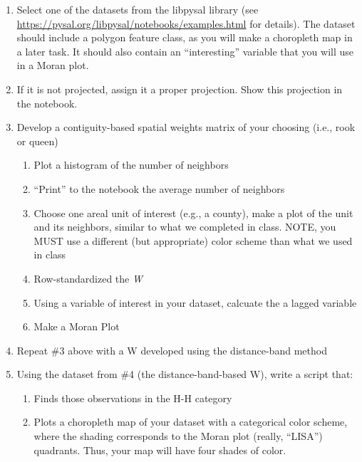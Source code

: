 \documentclass[]{article}
\providecommand{\tightlist}{%
  \setlength{\itemsep}{0pt}\setlength{\parskip}{0pt}}
\begin{document}
\begin{enumerate}
\def\labelenumi{\arabic{enumi}.}
\item
  Select one of the datasets from the libpysal library (see
  \url{https://pysal.org/libpysal/notebooks/examples.html} for details).
  The dataset should include a polygon feature class, as you will make a
  choropleth map in a later task. It should also contain an
  ``interesting'' variable that you will use in a Moran plot.
\item
  If it is not projected, assign it a proper projection. Show this
  projection in the notebook.
\item
  Develop a contiguity-based spatial weights matrix of your choosing
  (i.e., rook or queen)

  \begin{enumerate}
  \def\labelenumii{\arabic{enumii}.}
  \tightlist
  \item
    Plot a histogram of the number of neighbors
  \item
    ``Print'' to the notebook the average number of neighbors
  \item
    Choose one areal unit of interest (e.g., a county), make a plot of
    the unit and its neighbors, similar to what we completed in class.
    NOTE, you MUST use a different (but appropriate) color scheme than
    what we used in class
  \item
    Row-standardized the \emph{W}
  \item
    Using a variable of interest in your dataset, calcuate the a lagged
    variable
  \item
    Make a Moran Plot
  \end{enumerate}
\item
  Repeat \#3 above with a W developed using the distance-band method
\item
  Using the dataset from \#4 (the distance-band-based W), write a script
  that:

  \begin{enumerate}
  \def\labelenumii{\arabic{enumii}.}
  \tightlist
  \item
    Finds those observations in the H-H category
  \item
    Plots a choropleth map of your dataset with a categorical color
    scheme, where the shading corresponds to the Moran plot (really,
    ``LISA'') quadrants. Thus, your map will have four shades of color.
  \end{enumerate}
\end{enumerate}
\end{document}
